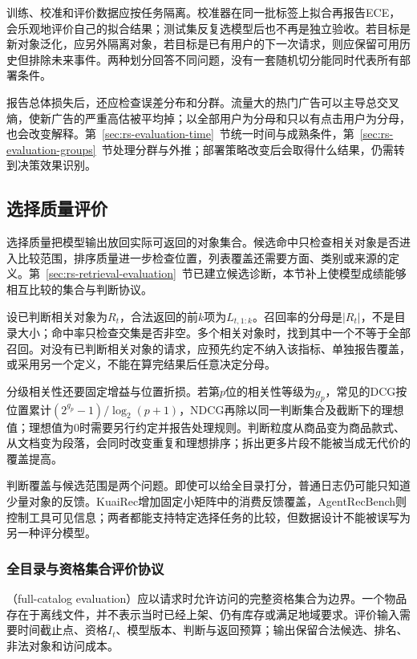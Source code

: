 训练、校准和评价数据应按任务隔离。校准器在同一批标签上拟合再报告ECE，会乐观地评价自己的拟合结果；测试集反复选模型后也不再是独立验收。若目标是新对象泛化，应另外隔离对象，若目标是已有用户的下一次请求，则应保留可用历史但排除未来事件。两种划分回答不同问题，没有一套随机切分能同时代表所有部署条件。

报告总体损失后，还应检查误差分布和分群。流量大的热门广告可以主导总交叉熵，使新广告的严重高估被平均掉；以全部用户为分母和只以有点击用户为分母，也会改变解释。第~\ref{sec:rs-evaluation-time}~节统一时间与成熟条件，第~\ref{sec:rs-evaluation-groups}~节处理分群与外推；部署策略改变后会取得什么结果，仍需转到决策效果识别。

\subsection{选择质量评价}
\label{sec:rs-evaluation-selection}

选择质量把模型输出放回实际可返回的对象集合。候选命中只检查相关对象是否进入比较范围，排序质量进一步检查位置，列表覆盖还需要方面、类别或来源的定义。第~\ref{sec:rs-retrieval-evaluation}~节已建立候选诊断，本节补上使模型成绩能够相互比较的集合与判断协议。

设已判断相关对象为$R_t$，合法返回的前$k$项为$L_{t,1:k}$。召回率的分母是$|R_t|$，不是目录大小；命中率只检查交集是否非空。多个相关对象时，找到其中一个不等于全部召回。对没有已判断相关对象的请求，应预先约定不纳入该指标、单独报告覆盖，或采用另一个定义，不能在算完结果后任意决定分母。

分级相关性还要固定增益与位置折损。若第$p$位的相关性等级为$g_p$，常见的DCG按位置累计$(2^{g_p}-1)/\log_2(p+1)$，NDCG再除以同一判断集合及截断下的理想值；理想值为0时需要另行约定并报告处理规则。判断粒度从商品变为商品款式、从文档变为段落，会同时改变重复和理想排序；拆出更多片段不能被当成无代价的覆盖提高。

判断覆盖与候选范围是两个问题。即使可以给全目录打分，普通日志仍可能只知道少量对象的反馈。KuaiRec增加固定小矩阵中的消费反馈覆盖，AgentRecBench则控制工具可见信息；两者都能支持特定选择任务的比较，但数据设计不能被误写为另一种评分模型。

\subsubsection{全目录与资格集合评价协议}
\label{sec:rs-evaluation-full-catalog}

（full-catalog evaluation）应以请求时允许访问的完整资格集合为边界。一个物品存在于离线文件，并不表示当时已经上架、仍有库存或满足地域要求。评价输入需要时间截止点、资格$I_t$、模型版本、判断与返回预算；输出保留合法候选、排名、非法对象和访问成本。


